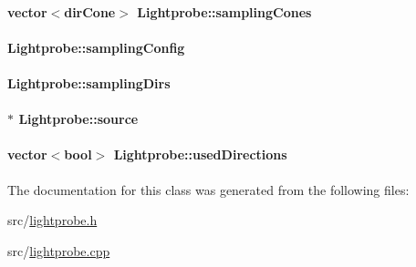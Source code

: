 \hypertarget{classLightprobe_a3bf62d3debaba3f19e2587d9e22ce204}{
\paragraph[{sampling\-Cones}]{\setlength{\rightskip}{0pt plus 5cm}vector$<${\bf dir\-Cone}$>$ {\bf \-Lightprobe\-::sampling\-Cones}}}\label{classLightprobe_a3bf62d3debaba3f19e2587d9e22ce204}
\hypertarget{classLightprobe_a8b0f2510b3c39b154ef72d571f46c16b}{
\paragraph[{sampling\-Config}]{ {\bf \-Lightprobe\-::sampling\-Config}}}\label{classLightprobe_a8b0f2510b3c39b154ef72d571f46c16b}
\hypertarget{classLightprobe_ad3aa93672a623bfb704576c466a7769e}{
\paragraph[{sampling\-Dirs}]{ {\bf \-Lightprobe\-::sampling\-Dirs}}}\label{classLightprobe_ad3aa93672a623bfb704576c466a7769e}
\hypertarget{classLightprobe_af923276096b3466a64bdda7bd76ed036}{
\paragraph[{source}]{$\ast$ {\bf \-Lightprobe\-::source}}}\label{classLightprobe_af923276096b3466a64bdda7bd76ed036}
\hypertarget{classLightprobe_a9f5c4447d145b52e5fe27d8bd6cdcfca}{
\paragraph[{used\-Directions}]{\setlength{\rightskip}{0pt plus 5cm}vector$<$bool$>$ {\bf \-Lightprobe\-::used\-Directions}}}\label{classLightprobe_a9f5c4447d145b52e5fe27d8bd6cdcfca}


\-The documentation for this class was generated from the following files\-:\begin{DoxyCompactItemize}
\item 
src/\hyperlink{lightprobe_8h}{lightprobe.\-h}\item 
src/\hyperlink{lightprobe_8cpp}{lightprobe.\-cpp}\end{DoxyCompactItemize}
